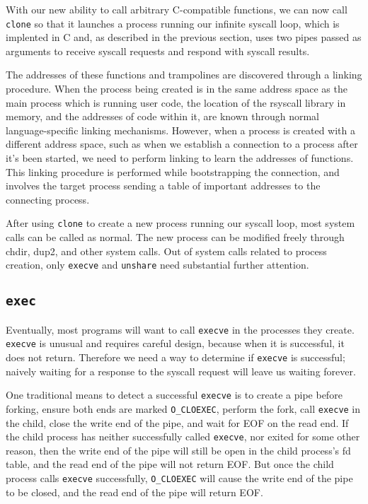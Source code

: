 \documentclass{acmart}
\begin{document}
With our new ability to call arbitrary C-compatible functions,
we can now call \texttt{clone} so that it launches a process running our infinite syscall loop,
which is implented in C and, as described in the previous section,
uses two pipes passed as arguments to receive syscall requests and respond with syscall results.

The addresses of these functions and trampolines are discovered through a linking procedure.
When the process being created is in the same address space as the main process which is running user code,
the location of the rsyscall library in memory, and the addresses of code within it,
are known through normal language-specific linking mechanisms.
However, when a process is created with a different address space,
such as when we establish a connection to a process after it's been started,
we need to perform linking to learn the addresses of functions.
This linking procedure is performed while bootstrapping the connection,
and involves the target process sending a table of important addresses to the connecting process.

After using \texttt{clone} to create a new process running our syscall loop,
most system calls can be called as normal.
The new process can be modified freely through chdir, dup2, and other system calls.
Out of system calls related to process creation,
only \texttt{execve} and \texttt{unshare} need substantial further attention.
\subsection{\texttt{exec}}
Eventually, most programs will want to call \texttt{execve} in the processes they create.
\texttt{execve} is unusual and requires careful design,
because when it is successful, it does not return.
Therefore we need a way to determine if \texttt{execve} is successful;
naively waiting for a response to the syscall request will leave us waiting forever.

One traditional means to detect a successful \texttt{execve} is to create a pipe before forking,
ensure both ends are marked \verb|O_CLOEXEC|,
perform the fork,
call \texttt{execve} in the child,
close the write end of the pipe,
and wait for EOF on the read end.
If the child process has neither successfully called \texttt{execve}, nor exited for some other reason,
then the write end of the pipe will still be open in the child process's fd table,
and the read end of the pipe will not return EOF.
But once the child process calls \texttt{execve} successfully,
\verb|O_CLOEXEC| will cause the write end of the pipe to be closed,
and the read end of the pipe will return EOF.
\end{document}
